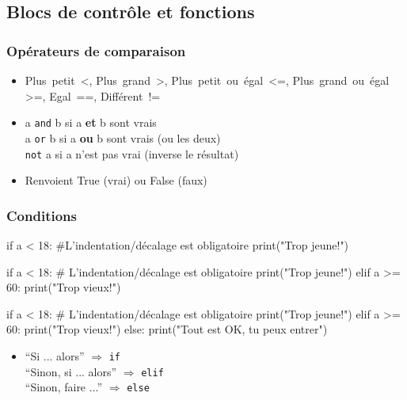 \documentclass{beamer}
\let\oldsubsubsection\subsubsection
\renewcommand{\subsubsection}[2][]{\def\currentsubsubsection{#2}\oldsubsubsection[#1]{#2}}
\begin{document}
\subsection{Blocs de contrôle et fonctions}

\subsubsection{Opérateurs de comparaison}

\begin{frame}
  \begin{itemize}
  \item Plus~petit~<, Plus~grand~>, Plus~petit~ou~égal~<=, Plus~grand~ou~égal >=, Egal~==, Différent~!=\\[0.5cm]
    
\item a \lstinline{and} b si a \textbf{et} b sont vrais\\
  a \lstinline{or} b si a \textbf{ou} b sont vrais (ou les deux)\\
  \lstinline{not} a si a n'est pas vrai (inverse le résultat)\\[0.5cm]
  
  \item Renvoient True (vrai) ou False (faux)
  \end{itemize}

\end{frame}

\subsubsection{Conditions}

\begin{code}{\codeboxa}
if a < 18:
    #L'indentation/décalage est obligatoire
    print("Trop jeune!")
\end{code}
\begin{code}{\codeboxb}
if a < 18:
    # L'indentation/décalage est obligatoire
    print("Trop jeune!")
elif a >= 60:
    print("Trop vieux!")
\end{code}
\begin{code}{\codeboxc}
if a < 18:
    # L'indentation/décalage est obligatoire
    print("Trop jeune!")
elif a >= 60:
    print("Trop vieux!")
else:
    print("Tout est OK, tu peux entrer")
\end{code}
\begin{frame}
  \begin{itemize}
  \item ``Si ... alors'' $\Rightarrow$ \lstinline{if}\\
    ``Sinon, si ... alors'' $\Rightarrow$ \lstinline{elif}\\
    ``Sinon, faire ...'' $\Rightarrow$ \lstinline{else}
  \end{itemize}
  
    \begin{overprint}
    \usebox\codeboxa
    \usebox\codeboxb
    \usebox\codeboxc
    \end{overprint}
\end{frame}
\end{document}
